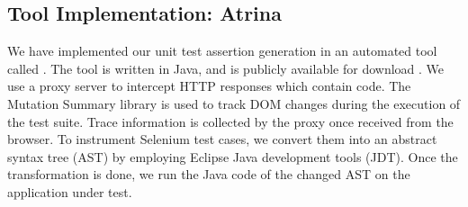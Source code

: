 \subsection{Tool Implementation: Atrina} \label{Sec:tool}

We have implemented our \javascript unit test assertion generation in an automated tool called \atrina. The tool is written in Java, and is publicly available for download \cite{atrina-dl}.
We use a proxy server to intercept HTTP responses which contain \javascript code. The \javascript Mutation Summary library \cite{mutationSummary} is used to track DOM changes during the execution of the test suite. Trace information is collected by the proxy once received from the browser. To instrument Selenium test cases, we convert them into an abstract syntax tree (AST) by employing Eclipse Java development tools (JDT). Once the transformation is done, we run the Java code of the changed AST on the application under test.   

